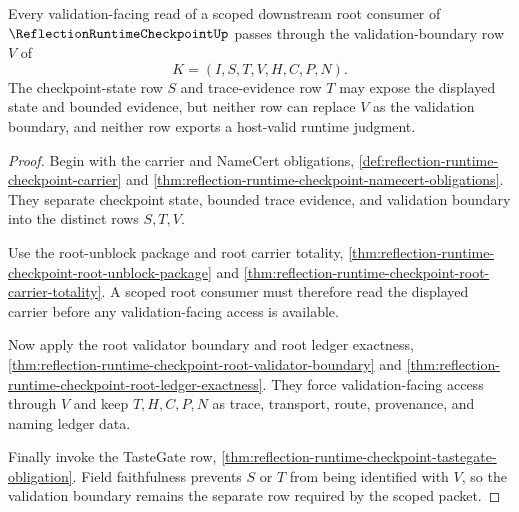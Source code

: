 \begin{theorem}
\label{thm:reflection-runtime-checkpoint-scoped-validation-boundary}
Every validation-facing read of a scoped downstream root consumer of $\ReflectionRuntimeCheckpointUp$ passes through the validation-boundary row $V$ of
$$
K=(I,S,T,V,H,C,P,N).
$$
The checkpoint-state row $S$ and trace-evidence row $T$ may expose the displayed state and bounded evidence, but neither row can replace $V$ as the validation boundary, and neither row exports a host-valid runtime judgment.
\end{theorem}
\begin{proof}
Begin with the carrier and NameCert obligations, \autoref{def:reflection-runtime-checkpoint-carrier} and \autoref{thm:reflection-runtime-checkpoint-namecert-obligations}. They separate checkpoint state, bounded trace evidence, and validation boundary into the distinct rows $S,T,V$.

Use the root-unblock package and root carrier totality, \autoref{thm:reflection-runtime-checkpoint-root-unblock-package} and \autoref{thm:reflection-runtime-checkpoint-root-carrier-totality}. A scoped root consumer must therefore read the displayed carrier before any validation-facing access is available.

Now apply the root validator boundary and root ledger exactness, \autoref{thm:reflection-runtime-checkpoint-root-validator-boundary} and \autoref{thm:reflection-runtime-checkpoint-root-ledger-exactness}. They force validation-facing access through $V$ and keep $T,H,C,P,N$ as trace, transport, route, provenance, and naming ledger data.

Finally invoke the TasteGate row, \autoref{thm:reflection-runtime-checkpoint-tastegate-obligation}. Field faithfulness prevents $S$ or $T$ from being identified with $V$, so the validation boundary remains the separate row required by the scoped packet.
\end{proof}

